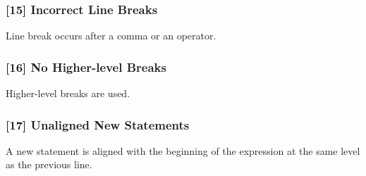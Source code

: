 \subsubsection{[15] Incorrect Line Breaks}
Line break occurs after a comma or an operator. 
\subsubsection{[16] No Higher-level Breaks}
Higher-level breaks are used.
\subsubsection{[17] Unaligned New Statements}
A new statement is aligned with the beginning of the expression at the same level as the previous line.